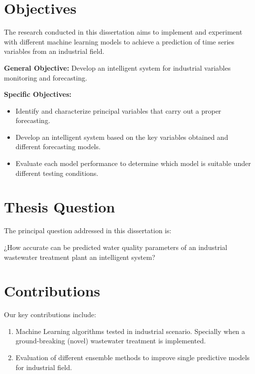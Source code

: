 \section{Objectives}
\label{s:Objectives}
The research conducted in this dissertation aims to implement and experiment with different machine learning models to achieve a prediction of time series variables from an industrial field.


\textbf{General Objective:} Develop an intelligent system for industrial variables monitoring and forecasting.

\textbf{Specific Objectives:}

\begin{itemize}
\item Identify and characterize principal variables that carry out a proper forecasting.
\item Develop an intelligent system based on the key variables obtained and different forecasting models.
\item Evaluate each model performance to determine which model is suitable under different testing conditions.
\end{itemize}

\section{Thesis Question}
\label{s:Question}
The principal question addressed in this dissertation is:

¿How accurate can be predicted water quality parameters of an industrial wastewater treatment plant an intelligent system?

\section{Contributions}
\label{s:Contributions}

Our key contributions include:

\begin{enumerate}

  \item Machine Learning algorithms tested in industrial scenario. Specially when a ground-breaking (novel) wastewater treatment is implemented. 
  
  \item Evaluation of different ensemble methods to improve single predictive models for industrial field.

\end{enumerate}

